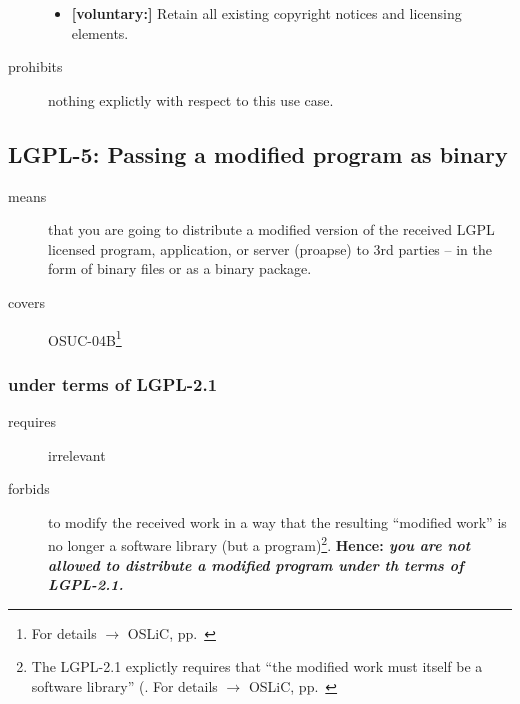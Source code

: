 \begin{description}
\begin{itemize}
  \item \textbf{[voluntary:]} Retain all existing copyright notices and
  licensing elements. 
  
 \end{itemize}
 
\item[prohibits] nothing explictly with respect to this use case.

\end{description}

\subsection{LGPL-5: Passing a modified program as binary}
\label{OSUC-04B-LGPL} 

\begin{description}
\item[means] that you are going to distribute a modified version of the received
LGPL licensed pro\-gram, application, or server (proapse) to 3rd parties -- in
the form of binary files or as a binary package.
\item[covers] OSUC-04B\footnote{For details $\rightarrow$ OSLiC, pp.\
\pageref{OSUC-04B-DEF}}
\end{description}

\subsubsection{under terms of LGPL-2.1}

\begin{description}
  \item[requires] irrelevant
  \item[forbids] to modify the received work in a way that the resulting
  \enquote{modified work} is no longer a software library (but a
  program)\footnote{The LGPL-2.1 explictly requires that \enquote{the modified
  work must itself be a software library} (\cite[cf.][\nopage wp.\
  §2a]{Lgpl21OsiLicense1999a}. For details $\rightarrow$ OSLiC, pp.\
  \pageref{para:libislib}}. \textbf{Hence: \emph{you are not allowed to
  distribute a modified program under th terms of LGPL-2.1.}}
\end{description}

